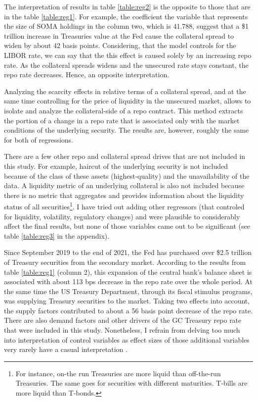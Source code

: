 \documentclass[11pt,a4paper,english,oneside]{article}
\begin{document}
The interpretation of results in table \ref{table:reg2} is the opposite to those that are in the table \ref{table:reg1}. For example, the coefficient the variable that represents the size of SOMA holdings in the column two, which is 41.788, suggest that a \$1 trillion increase in Treasuries value at the Fed cause the collateral spread to widen by about 42 basis points. Considering, that the model controls for the LIBOR rate, we can say that the this effect is caused solely by an increasing repo rate. As the collateral spreads widens and the unsecured rate stays constant, the repo rate decreases. Hence, an opposite interpretation.

Analyzing the scarcity effects in relative terms of a collateral spread, and at the same time controlling for the price of liquidity in the unsecured market, allows to isolate and analyze the collateral-side of a repo contract. This method extracts the portion of a change in a repo rate that is associated only with the market conditions of the underlying security. The results are, however, roughly the same for both of regressions.

There are a few other repo and collateral spread drives that are not included in this study. For example, haircut of the underlying security is not included because of the class of these assets (highest-quality) and the unavailability of the data. A liquidity metric of an underlying collateral is also not included because there is no metric that aggregates and provides information about the liquidity status of all securities\footnote{For instance, on-the run Treasuries are more liquid than off-the-run Treasuries. The same goes for securities with different maturities. T-bills are more liquid than T-bonds.}. I have tried out adding other regressors (that controled for liquidity, volatility, regulatory changes) and were plausible to considerably affect the final results, but none of those variables came out to be significant (see table \ref{table:reg3} in the appendix).


Since September 2019 to the end of 2021, the Fed has purchased over \$2.5 trillion of Treasury securities from the secondary market. According to the results from table \ref{table:reg1} (column 2), this expansion of the central bank's balance sheet is associated with about 113 bps decrease in the repo rate over the whole period. At the same time the US Treasury Department, through its fiscal stimulus programs, was supplying Treasury securities to the market. Taking two effects into account, the supply factors contributed to about a 56 basis point decrease of the repo rate. There are also demand factors and other drivers of the GC Treasury repo rate that were included in this study. Nonetheless, I refrain from delving too much into interpretation of control variables as effect sizes of those additional variables very rarely have a casual interpretation \citet{hunermund2020}.
\end{document}
